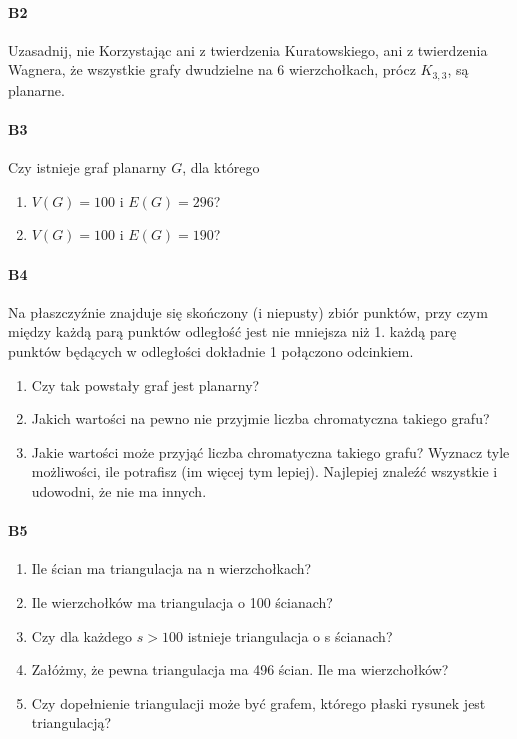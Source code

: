 \paragraph{B2} Uzasadnij, nie Korzystając ani z twierdzenia Kuratowskiego, ani z twierdzenia Wagnera, że wszystkie
grafy dwudzielne na 6 wierzchołkach, prócz $K_{3,3}$, są planarne.

\paragraph{B3} Czy istnieje graf planarny $G$, dla którego
\begin{enumerate}[label=\alph*)]
\item $V(G) = 100$ i $E(G) = 296$?
\item $V(G) = 100$ i $E(G) = 190$?
\end{enumerate}

\paragraph{B4} Na płaszczyźnie znajduje się skończony (i niepusty) zbiór punktów, przy czym między każdą
parą punktów odległość jest nie mniejsza niż 1. każdą parę punktów będących w odległości dokładnie 1 połączono odcinkiem.
\begin{enumerate}[label=\alph*)]
\item Czy tak powstały graf jest planarny?
\item Jakich wartości na pewno nie przyjmie liczba chromatyczna takiego grafu?
\item Jakie wartości może przyjąć liczba chromatyczna takiego grafu? Wyznacz tyle możliwości, ile potrafisz (im więcej tym lepiej). Najlepiej znaleźć wszystkie i udowodni, że nie ma innych.
\end{enumerate}

\paragraph{B5}
\begin{enumerate}[label=\alph*)]
\item Ile ścian ma triangulacja na n wierzchołkach?
\item Ile wierzchołków ma triangulacja o 100 ścianach?
\item Czy dla każdego $s > 100$ istnieje triangulacja o s ścianach?
\item Załóżmy, że pewna triangulacja ma 496 ścian. Ile ma wierzchołków?
\item Czy dopełnienie triangulacji może być grafem, którego płaski rysunek jest triangulacją? 
\end{enumerate}

